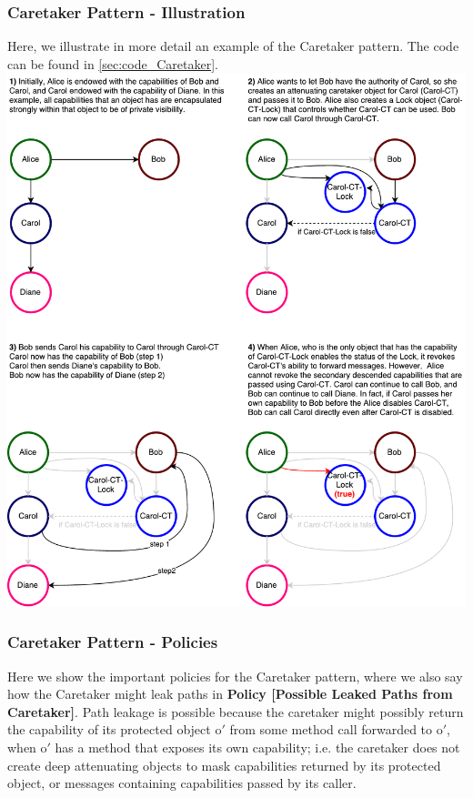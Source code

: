 \documentclass[a4paper,11pt,twoside]{article}
\begin{document}
{\begin{minipage}{\textwidth}
\subsubsection{Caretaker Pattern - Illustration}\label{sec:figcaretaker}
\small Here, we illustrate in more detail an example of the Caretaker pattern. The code can be found in \cref{sec:code_Caretaker}.\\
\includegraphics[width=1.05\textwidth]{figures/Caretaker.pdf}
  \label{fig:figcaretaker}
\end{minipage}
\clearpage
\subsubsection{Caretaker Pattern - Policies}\label{sec:caretakerpolicies}
Here we show the important policies for the Caretaker pattern, where we also say how the Caretaker might leak paths in \textbf{Policy [Possible Leaked Paths from Caretaker]}. Path leakage is possible because the caretaker might possibly return the capability of its protected object o$'$ from some method call forwarded to o$'$, when o$'$ has a method that exposes its own capability; i.e. the caretaker does not create deep attenuating objects to mask capabilities returned by its protected object, or messages containing capabilities passed by its caller.\\

}
\end{document}
